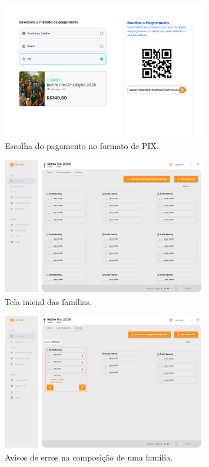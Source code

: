 \begin{figure}[H]
\centering
\includegraphics[width=0.8\textwidth]{images/prototipacao/participant_login/Payment Page - Retiro-1.png}
\caption{Escolha do pagamento no formato de PIX.}
\end{figure}


\begin{figure}[H]
\centering
\includegraphics[width=0.8\textwidth]{images/prototipacao/familia/Familias-3.png}
\caption{Tela inicial das famílias.}
\end{figure}

\begin{figure}[H]
\centering
\includegraphics[width=0.8\textwidth]{images/prototipacao/familia/Familias-2.png}
\caption{Avisos de erros na composição de uma família.}
\end{figure}

